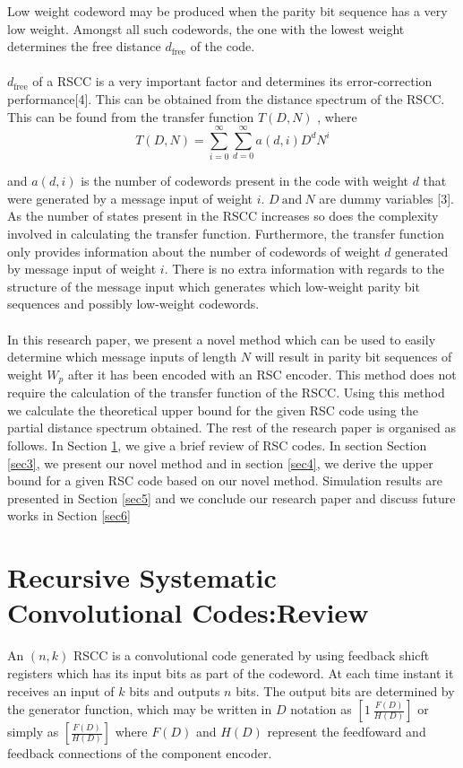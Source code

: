 \documentclass[twocolumn]{article}
\begin{document}
Low weight codeword may be produced when the parity bit sequence has a very low weight. Amongst all such codewords, the one with the lowest weight determines the free distance $d_{\text{free}}$ of the code. 
\paragraph{}$d_{\text{free}}$  of a RSCC is a very important factor and determines its error-correction performance[4].  This can be obtained from the distance spectrum of the RSCC. This can be found from the transfer function $T(D,N)$ , where 
$$
T(D,N)=\sum_{i=0}^{\infty}\sum_{d=0}^{\infty} a(d,i)D^dN^i
$$

and $a(d,i)$ is the number of codewords present in the code with weight $d$ that were generated by a message input of weight $i$. $D ~\text{and} ~ N$ are dummy variables [3]. As the number of states present in the RSCC increases so does the complexity involved in calculating the transfer function. Furthermore, the transfer function only provides information about the number of codewords of weight $d$ generated by message input of weight $i$. There is no extra information with regards to the structure of the message input which generates which low-weight parity bit sequences and possibly low-weight codewords.

\paragraph{}In this research paper, we present a novel method which can be used to easily determine which message inputs of length $N$ will result in parity bit sequences of weight $W_p$ after it has been encoded with an RSC encoder. This method does not require the calculation of the transfer function of the RSCC. Using this method we calculate the theoretical upper bound for the given RSC code using the partial distance spectrum obtained. The rest of the research paper is organised as follows. In Section \ref{sec2}, we give a brief review of RSC codes. In section Section \ref{sec3}, we present our novel method and in section \ref{sec4}, we derive the upper bound for a given RSC code based on our novel method. Simulation results are presented in Section \ref{sec5} and we conclude our research paper and discuss future works in Section \ref{sec6}

\section{Recursive Systematic Convolutional Codes:Review}
\label{sec2}
An  $(n,k)$ RSCC is a convolutional code generated by using feedback shicft registers which has its input bits as part of the codeword. At each time instant it receives an input of $k$ bits and outputs $n$ bits. The output bits are determined by the generator function, which may be written in $D$ notation as  $[1 ~\frac{F(D)}{H(D)}]$ or simply as $[\frac{F(D)}{H(D)}]$ where $F(D)$ and $H(D)$ represent the feedfoward and feedback connections of the component encoder.
\end{document}
